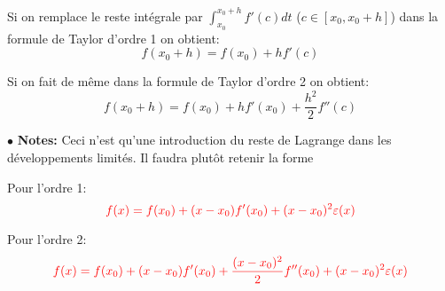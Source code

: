 \documentclass[a4paper]{article}
\theoremstyle{break}
\newcommand{\note}{$\bullet$ \textbf{Notes: }}
\begin{document}
Si on remplace le reste intégrale par $\int_{x_0}^{x_0+h} f'(c) dt$
($c \in [x_0, x_0+h]$) dans la formule de Taylor d'ordre 1
on obtient:
\[
  f(x_0 +h) = f(x_0) + hf'(c)
\]

Si on fait de même dans la formule de Taylor d'ordre 2 on obtient:
\[
  f(x_0 +h) = f(x_0) + hf'(x_0) + \frac{h^2}{2}f''(c)
\]

\note Ceci n'est qu'une introduction du reste de Lagrange dans les
développements limités. Il faudra plutôt retenir la forme

Pour l'ordre 1:
\[
    \color{red}{
      f(x) = f(x_0) + (x-x_0)f'(x_0) + (x-x_0)^2 \varepsilon(x) }
\]

Pour l'ordre 2:
\[
    \color{red}{
    f(x) = f(x_0) + (x-x_0)f'(x_0) + \frac{(x-x_0)^2}{2} f''(x_0)
    + (x-x_0)^2 \varepsilon(x) }
\]
\end{document}

